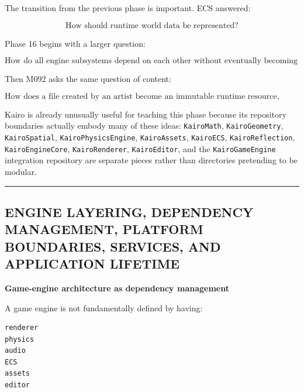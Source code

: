 \hypertarget{05-engine-i-ch010-engine-architecture-dependency-direction-runtime-boundaries-platformbackend-abstraction-asset-identity-import-pipelines-dependency-graphs-ddc-hot-reload-streaming-residency-and-gpu-safe-lifetime}{}

The transition from the previous phase is important. ECS answered:

\[
\text{How should runtime world data be represented?}
\]

Phase 16 begins with a larger question:

\[
\boxed{
\text{How do all engine subsystems depend on each other without eventually becoming one inseparable program?}
}
\]

Then M092 asks the same question of content:

\[
\boxed{
\text{How does a file created by an artist become an immutable runtime resource,
while remaining reproducible, reloadable, cacheable and safe for the GPU?}
}
\]

Kairo is already unusually useful for teaching this phase because its repository boundaries actually embody many of these ideas: \texttt{KairoMath}, \texttt{KairoGeometry}, \texttt{KairoSpatial}, \texttt{KairoPhysicsEngine}, \texttt{KairoAssets}, \texttt{KairoECS}, \texttt{KairoReflection}, \texttt{KairoEngineCore}, \texttt{KairoRenderer}, \texttt{KairoEditor}, and the \texttt{KairoGameEngine} integration repository are separate pieces rather than directories pretending to be modular.

\begin{center}\rule{0.5\linewidth}{0.5pt}\end{center}

\subsection{ENGINE LAYERING, DEPENDENCY MANAGEMENT, PLATFORM BOUNDARIES, SERVICES, AND APPLICATION LIFETIME}\label{05-engine-i-ch010-engine-layering-dependency-management-platform-boundaries-services-and-application-lifetime}

\hypertarget{05-engine-i-ch010-engine-layering-dependency-management-platform-boundaries-services-and-application-lifetime}{}

\textbf{Game-engine architecture as dependency management}

A game engine is not fundamentally defined by having:

\begin{verbatim}
renderer
physics
audio
ECS
assets
editor
\end{verbatim}

